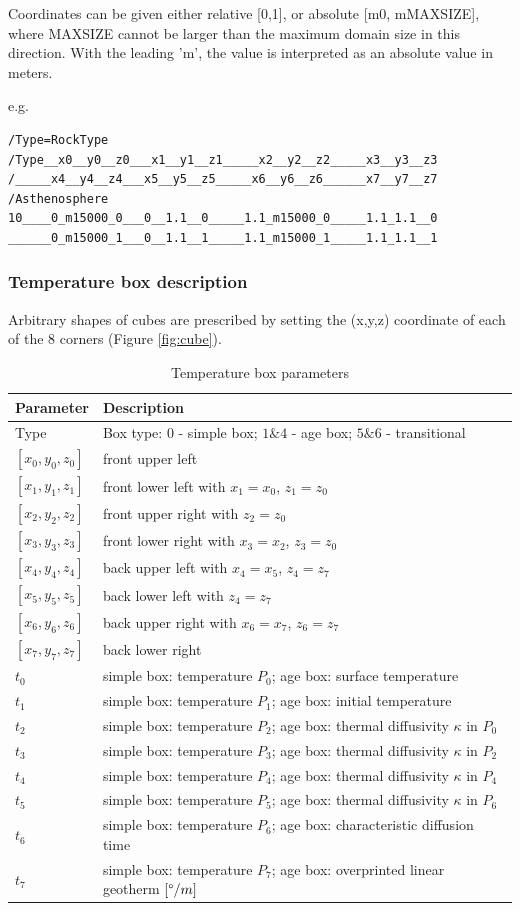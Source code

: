 Coordinates can be given either relative [0,1], or absolute [m0, mMAXSIZE], where MAXSIZE cannot be larger than the maximum domain size in this direction. With the leading 'm', the value is interpreted as an absolute value in meters.

e.g.
\begin{lstlisting}
/Type=RockType
/Type__x0__y0__z0___x1__y1__z1_____x2__y2__z2_____x3__y3__z3
/_____x4__y4__z4___x5__y5__z5_____x6__y6__z6______x7__y7__z7
/Asthenosphere
10____0_m15000_0___0__1.1__0_____1.1_m15000_0_____1.1_1.1__0
______0_m15000_1___0__1.1__1_____1.1_m15000_1_____1.1_1.1__1
\end{lstlisting}

\subsubsection{Temperature box description}
Arbitrary shapes of cubes are prescribed by setting the (x,y,z) coordinate of each of the 8 corners (Figure \ref{fig:cube}).

\begin{table}[H]
\centering
\begin{tabular}{l l}
\toprule
Parameter		& Description\\
\midrule
Type			& Box type: $0$ - simple box; $1\&4$ - age box; $5\&6$ - transitional\\
$[x_0,y_0,z_0]$ & front upper left\\
$[x_1,y_1,z_1]$ & front lower left with $x_1=x_0$, $z_1=z_0$\\
$[x_2,y_2,z_2]$ & front upper right with $z_2=z_0$\\ 
$[x_3,y_3,z_3]$ & front lower right with $x_3=x_2$, $z_3=z_0$\\ 
$[x_4,y_4,z_4]$ & back upper left with $x_4=x_5$, $z_4=z_7$\\  
$[x_5,y_5,z_5]$ & back lower left with $z_4=z_7$\\ 
$[x_6,y_6,z_6]$ & back upper right with $x_6=x_7$, $z_6=z_7$\\
$[x_7,y_7,z_7]$ & back lower right\\
$t_0$ & simple box: temperature $P_0$; age box: surface temperature\\
$t_1$ & simple box: temperature $P_1$; age box: initial temperature\\
$t_2$ & simple box: temperature $P_2$; age box: thermal diffusivity $\kappa$ in $P_0$\\
$t_3$ & simple box: temperature $P_3$; age box: thermal diffusivity $\kappa$ in $P_2$\\
$t_4$ & simple box: temperature $P_4$; age box: thermal diffusivity $\kappa$ in $P_4$\\
$t_5$ & simple box: temperature $P_5$; age box: thermal diffusivity $\kappa$ in $P_6$\\
$t_6$ & simple box: temperature $P_6$; age box: characteristic diffusion time\\
$t_7$ & simple box: temperature $P_7$; age box: overprinted linear geotherm $[\degree/m]$\\
\bottomrule
\end{tabular}
\caption{Temperature box parameters}
\label{tbl:t_box_parameters}
\end{table}

